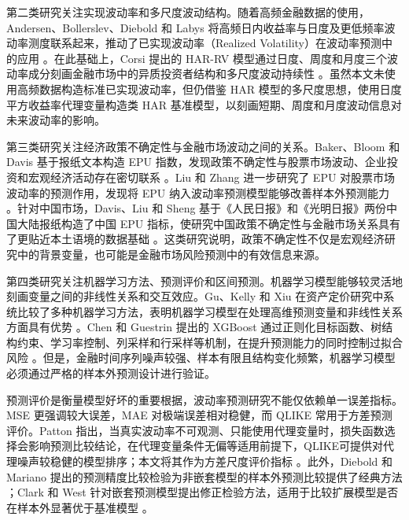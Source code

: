 第二类研究关注实现波动率和多尺度波动结构。随着高频金融数据的使用，Andersen、Bollerslev、Diebold 和 Labys 将高频日内收益率与日度及更低频率波动率测度联系起来，推动了已实现波动率（Realized Volatility）在波动率预测中的应用 \citep{AndersenBollerslevDieboldLabys2003}。在此基础上，Corsi 提出的 HAR-RV 模型通过日度、周度和月度三个波动率成分刻画金融市场中的异质投资者结构和多尺度波动持续性 \citep{Corsi2009}。虽然本文未使用高频数据构造标准已实现波动率，但仍借鉴 HAR 模型的多尺度思想，使用日度平方收益率代理变量构造类 HAR 基准模型，以刻画短期、周度和月度波动信息对未来波动率的影响。

第三类研究关注经济政策不确定性与金融市场波动之间的关系。Baker、Bloom 和 Davis 基于报纸文本构造 EPU 指数，发现政策不确定性与股票市场波动、企业投资和宏观经济活动存在密切联系 \citep{BakerBloomDavis2016}。Liu 和 Zhang 进一步研究了 EPU 对股票市场波动率的预测作用，发现将 EPU 纳入波动率预测模型能够改善样本外预测能力 \citep{LiuZhang2015}。针对中国市场，Davis、Liu 和 Sheng 基于《人民日报》和《光明日报》两份中国大陆报纸构造了中国 EPU 指标，使研究中国政策不确定性与金融市场关系具有了更贴近本土语境的数据基础 \citep{DavisLiuSheng2019}。这类研究说明，政策不确定性不仅是宏观经济研究中的背景变量，也可能是金融市场风险预测中的有效信息来源。

第四类研究关注机器学习方法、预测评价和区间预测。机器学习模型能够较灵活地刻画变量之间的非线性关系和交互效应。Gu、Kelly 和 Xiu 在资产定价研究中系统比较了多种机器学习方法，表明机器学习模型在处理高维预测变量和非线性关系方面具有优势 \citep{GuKellyXiu2020}。Chen 和 Guestrin 提出的 XGBoost 通过正则化目标函数、树结构约束、学习率控制、列采样和行采样等机制，在提升预测能力的同时控制过拟合风险 \citep{ChenGuestrin2016}。但是，金融时间序列噪声较强、样本有限且结构变化频繁，机器学习模型必须通过严格的样本外预测设计进行验证。

预测评价是衡量模型好坏的重要根据，波动率预测研究不能仅依赖单一误差指标。MSE 更强调较大误差，MAE 对极端误差相对稳健，而 QLIKE 常用于方差预测评价。Patton 指出，当真实波动率不可观测、只能使用代理变量时，损失函数选择会影响预测比较结论，在代理变量条件无偏等适用前提下，QLIKE可提供对代理噪声较稳健的模型排序；本文将其作为方差尺度评价指标 \citep{Patton2011}。此外，Diebold 和 Mariano 提出的预测精度比较检验为非嵌套模型的样本外预测比较提供了经典方法 \citep{DieboldMariano1995}；Clark 和 West 针对嵌套预测模型提出修正检验方法，适用于比较扩展模型是否在样本外显著优于基准模型 \citep{ClarkWest2007}。

